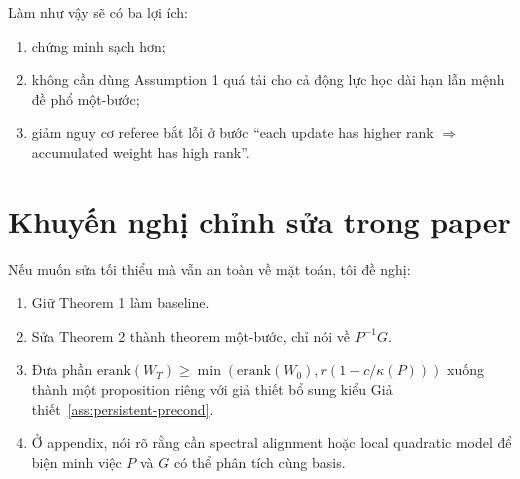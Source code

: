 \documentclass[11pt,a4paper]{article}
\newcommand{\erank}{\mathrm{erank}}
\begin{document}
\noindent
Làm như vậy sẽ có ba lợi ích:
\begin{enumerate}[nosep]
    \item chứng minh sạch hơn;
    \item không cần dùng Assumption 1 quá tải cho cả động lực học dài hạn lẫn mệnh đề phổ một-bước;
    \item giảm nguy cơ referee bắt lỗi ở bước ``each update has higher rank $\Rightarrow$ accumulated weight has high rank''.
\end{enumerate}

\section*{Khuyến nghị chỉnh sửa trong paper}
Nếu muốn sửa tối thiểu mà vẫn an toàn về mặt toán, tôi đề nghị:
\begin{enumerate}[nosep]
    \item Giữ Theorem 1 làm baseline.
    \item Sửa Theorem 2 thành theorem một-bước, chỉ nói về $P^{-1}G$.
    \item Đưa phần $\erank(W_T)\ge \min(\erank(W_0),r(1-c/\kappa(P)))$ xuống thành một proposition riêng với giả thiết bổ sung kiểu Giả thiết~\ref{ass:persistent-precond}.
    \item Ở appendix, nói rõ rằng cần spectral alignment hoặc local quadratic model để biện minh việc $P$ và $G$ có thể phân tích cùng basis.
\end{enumerate}
\end{document}
